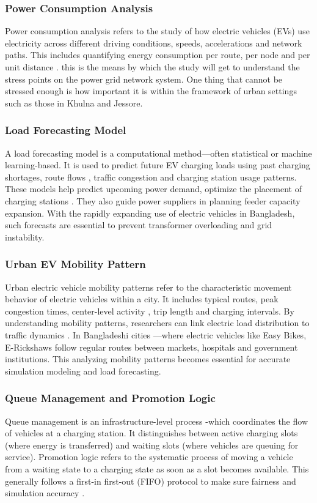 \documentclass{thesis-library}
\begin{document}
\subsubsection{Power Consumption Analysis}
Power consumption analysis refers to the study of how electric vehicles (EVs) use electricity across different driving conditions, speeds, accelerations and network paths. This includes quantifying energy consumption per route, per node and per unit distance \cite{zhou2019probabilistic}. this is the means by which the study will get to understand the stress points on the power grid network system. One thing that cannot be stressed enough is how important it is within the framework of urban settings such as those in Khulna and Jessore.

\subsubsection{Load Forecasting Model}
A load forecasting model is a computational method—often statistical or machine learning-based. It is used to predict future EV charging loads using past charging shortages, route flows , traffic congestion and charging station usage patterns. These models help predict upcoming power demand, optimize the placement of charging stations \cite{regression_ev2020}. They also guide power suppliers in planning feeder capacity expansion. With the rapidly expanding use of electric vehicles in Bangladesh, such forecasts are essential to prevent transformer overloading and grid instability.

\subsubsection{Urban EV Mobility Pattern}
Urban electric vehicle mobility patterns refer to the characteristic movement behavior of electric vehicles within a city. It includes typical routes, peak congestion times, center-level activity , trip length and charging intervals. By understanding mobility patterns, researchers can link electric load distribution to traffic dynamics . In Bangladeshi cities —where electric vehicles like Easy Bikes, E-Rickshaws follow regular routes between markets, hospitals and government institutions. This analyzing mobility patterns becomes essential for accurate simulation modeling and load forecasting.

\subsubsection{Queue Management and Promotion Logic}
Queue management is an infrastructure-level process -which coordinates the flow of vehicles at a charging station. It distinguishes between active charging slots (where energy is transferred) and waiting slots (where vehicles are queuing for service). Promotion logic refers to the systematic process of moving a vehicle from a waiting state to a charging state as soon as a slot becomes available. This generally follows a first-in first-out (FIFO) protocol to make sure fairness and simulation accuracy \cite{queue_management2023}.
\end{document}
